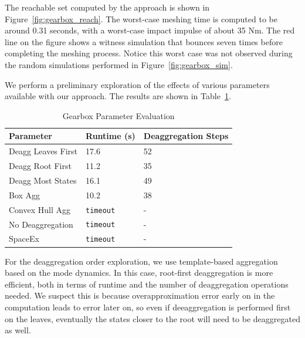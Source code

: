 The reachable set computed by the approach is shown in Figure~\ref{fig:gearbox_reach}.
%
The worst-case meshing time is computed to be around 0.31 seconds, with a worst-case impact impulse of about 35 Nm.
%
The red line on the figure shows a witness simulation that bounces seven times before completing the meshing process.
%
Notice this worst case was not observed during the random simulations performed in Figure~\ref{fig:gearbox_sim}.

We perform a preliminary exploration of the effects of various parameters available with our approach.
%
The results are shown in Table~\ref{tab:gearbox_params}.

\begin{table}%
  \caption{Gearbox Parameter Evaluation} \label{tab:gearbox_params}%
\begin{tabular}{@{}lll@{}}%
\toprule%
\bf{Parameter} & \bf{Runtime (s)} & \bf{Deaggregation Steps} \\%
\midrule%
Deagg Leaves First & 17.6 & 52 \\
Deagg Root First & 11.2 & 35 \\
Deagg Most States & 16.1 & 49 \\
\hdashline[0.8pt/2pt]
Box Agg & 10.2 & 38 \\
Convex Hull Agg & \texttt{timeout} & - \\
\hdashline[0.8pt/2pt]
No Deaggregation & \texttt{timeout} & - \\
SpaceEx & \texttt{timeout} & - \\
\bottomrule
\end{tabular}%
\end{table}

For the deaggregation order exploration, we use template-based aggregation based on the mode dynamics.
%
In this case, root-first deaggregation is more efficient, both in terms of runtime and the number of deaggregation operations needed.
%
We suspect this is because overapproximation error early on in the computation leads to error later on, so even if deeaggregation is performed first on the leaves,
eventually the states closer to the root will need to be deaggregated as well.

